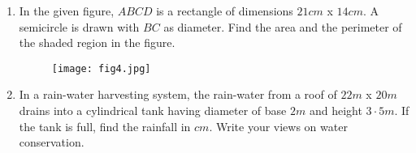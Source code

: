 \documentclass{article}
\begin{document}
\begin{enumerate}
																																																																											         \item In the given figure, $ABCD$ is a rectangle of dimensions $21 cm$ x $14 cm$. A semicircle is drawn with $BC$ as diameter. Find the area and the perimeter of the shaded region in the figure.
																																																																													     \begin{figure}[h]
																																																																														             \centering
																																																																															             \texttt{[image: fig4.jpg]}
																																																																																         \end{figure}
																																																																																	     
																																																																																	         \item In a rain-water harvesting system, the rain-water from a roof of $22 m$ x $20m$ drains into a cylindrical tank having diameter of base $2 m$ and height $3·5 m$. If the tank is full, find the rainfall in $cm$. Write your views on water conservation.
																																																																																			     


											    \end{enumerate}
										    
\end{document}
